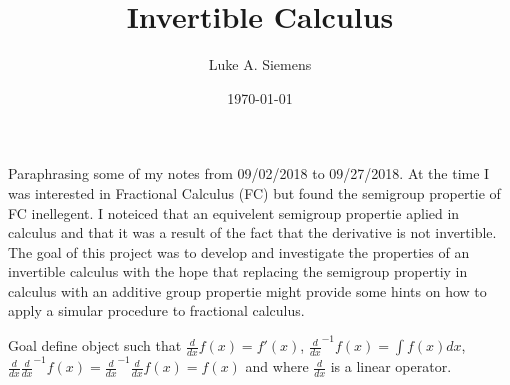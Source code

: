 \documentclass[%
 onecolumn,
 amsmath, amssymb, aps, pra, 10pt
]{revtex4-2}
\begin{document}
\title{Invertible Calculus}%
\author{Luke A. Siemens}
\noaffiliation
\date{\today}
\maketitle

Paraphrasing some of my notes from 09/02/2018 to 09/27/2018. At the time I was interested in Fractional Calculus (FC) but found the semigroup propertie of FC inellegent. I noteiced that an equivelent semigroup propertie aplied in calculus and that it was a result of the fact that the derivative is not invertible. The goal of this project was to develop and investigate the properties of an invertible calculus with the hope that replacing the semigroup propertiy in calculus with an additive group propertie might provide some hints on how to apply a simular procedure to fractional calculus.

Goal define object such that $\frac{d}{dx}f(x)=f'(x)$, $\frac{d}{dx}^{-1}f(x) = \int	f(x)dx$, $\frac{d}{dx}\frac{d}{dx}^{-1}f(x) = \frac{d}{dx}^{-1}\frac{d}{dx}f(x) = f(x)$ and where $\frac{d}{dx}$ is a linear operator.
\end{document}
